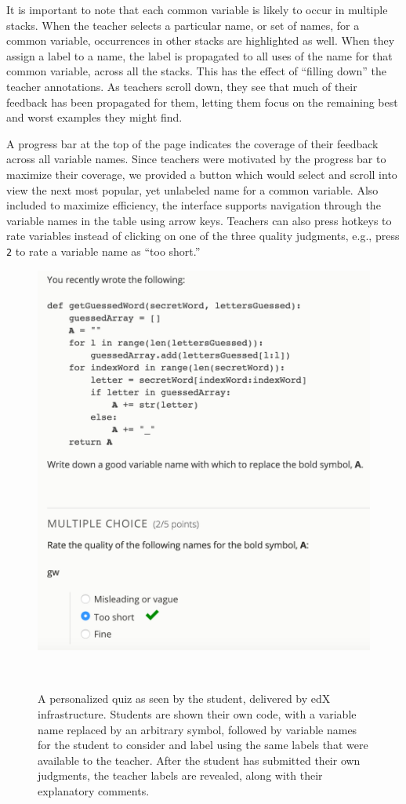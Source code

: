 {{It is important to note that each common variable is likely to occur in multiple stacks. When the teacher selects a particular name, or set of names, for a common variable, occurrences in other stacks are highlighted as well. When they assign a label to a name, the label is propagated to all uses of the name for that common variable, across all the stacks. This has the effect of ``filling down'' the teacher annotations. As teachers scroll down, they see that much of their feedback has been propagated for them, letting them focus on the remaining best and worst examples they might find. 

A progress bar at the top of the page indicates the coverage of their feedback across all variable names. Since teachers were motivated by the progress bar to maximize their coverage, we provided a button which would select and scroll into view the next most popular, yet unlabeled name for a common variable. Also included to maximize efficiency, the interface supports navigation through the variable names in the table using arrow keys. Teachers can also press hotkeys to rate variables instead of clicking on one of the three quality judgments, e.g., press \texttt{2} to rate a variable name as ``too short.''

\begin{figure}
\centering
\includegraphics[width=0.95\columnwidth]{Body/figures/foobaz/feedbackQuizExample.png}
\caption{A personalized quiz as seen by the student, delivered by edX infrastructure. Students are shown their own code, with a variable name replaced by an arbitrary symbol, followed by variable names for the student to consider and label using the same labels that were available to the teacher. After the student has submitted their own judgments, the teacher labels are revealed, along with their explanatory comments.}~\label{fig:figure4}
\end{figure}

}}
